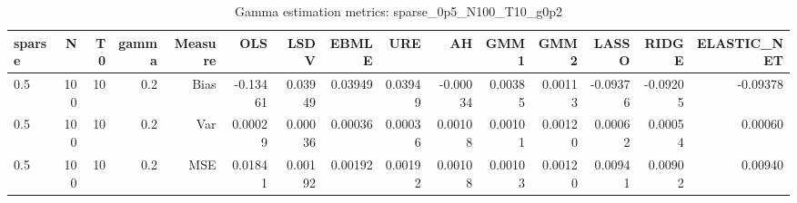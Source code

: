 \begin{table}[!htbp]\centering
\caption{Gamma estimation metrics: sparse_0p5_N100_T10_g0p2}
\label{tab:table1_sparse_0p5_N100_T10_g0p2}
\begin{tabular}{lrrrrrrrrrrrrrr}
\hline
sparse & N & T0 & gamma & Measure & OLS & LSDV & EBMLE & URE & AH & GMM1 & GMM2 & LASSO & RIDGE & ELASTIC_NET \\
\hline
0.5 & 100 & 10 & 0.2 & Bias & -0.13461 & 0.03949 & 0.03949 & 0.03949 & -0.00034 & 0.00385 & 0.00113 & -0.09376 & -0.09205 & -0.09378 \\
0.5 & 100 & 10 & 0.2 & Var & 0.00029 & 0.00036 & 0.00036 & 0.00036 & 0.00108 & 0.00101 & 0.00120 & 0.00062 & 0.00054 & 0.00060 \\
0.5 & 100 & 10 & 0.2 & MSE & 0.01841 & 0.00192 & 0.00192 & 0.00192 & 0.00108 & 0.00103 & 0.00120 & 0.00941 & 0.00902 & 0.00940 \\
\hline
\end{tabular}
\end{table}

